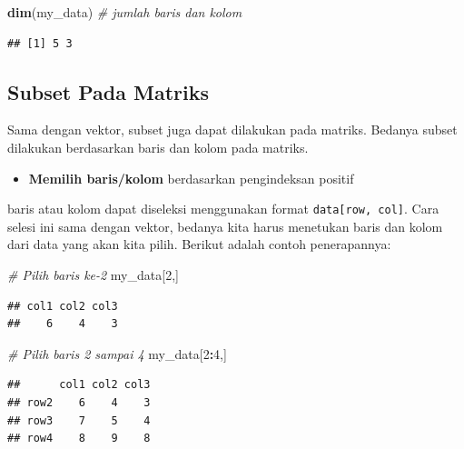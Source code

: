 \documentclass[]{book}
\newenvironment{Shaded}{\begin{snugshade}}{\end{snugshade}}
\newcommand{\KeywordTok}[1]{\textcolor[rgb]{0.13,0.29,0.53}{\textbf{#1}}}
\newcommand{\DecValTok}[1]{\textcolor[rgb]{0.00,0.00,0.81}{#1}}
\newcommand{\CommentTok}[1]{\textcolor[rgb]{0.56,0.35,0.01}{\textit{#1}}}
\newcommand{\OperatorTok}[1]{\textcolor[rgb]{0.81,0.36,0.00}{\textbf{#1}}}
\newcommand{\NormalTok}[1]{#1}
\providecommand{\tightlist}{%
  \setlength{\itemsep}{0pt}\setlength{\parskip}{0pt}}
\begin{document}
\begin{Shaded}
\begin{Highlighting}[]
\KeywordTok{dim}\NormalTok{(my_data) }\CommentTok{# jumlah baris dan kolom}
\end{Highlighting}
\end{Shaded}

\begin{verbatim}
## [1] 5 3
\end{verbatim}

\subsection{Subset Pada Matriks}\label{subset-pada-matriks}

Sama dengan vektor, subset juga dapat dilakukan pada matriks. Bedanya
subset dilakukan berdasarkan baris dan kolom pada matriks.

\begin{itemize}
\tightlist
\item
  \textbf{Memilih baris/kolom} berdasarkan pengindeksan positif
\end{itemize}

baris atau kolom dapat diseleksi menggunakan format
\texttt{data{[}row,\ col{]}}. Cara selesi ini sama dengan vektor,
bedanya kita harus menetukan baris dan kolom dari data yang akan kita
pilih. Berikut adalah contoh penerapannya:

\begin{Shaded}
\begin{Highlighting}[]
\CommentTok{# Pilih baris ke-2}
\NormalTok{my_data[}\DecValTok{2}\NormalTok{,]}
\end{Highlighting}
\end{Shaded}

\begin{verbatim}
## col1 col2 col3 
##    6    4    3
\end{verbatim}

\begin{Shaded}
\begin{Highlighting}[]
\CommentTok{# Pilih baris 2 sampai 4}
\NormalTok{my_data[}\DecValTok{2}\OperatorTok{:}\DecValTok{4}\NormalTok{,]}
\end{Highlighting}
\end{Shaded}

\begin{verbatim}
##      col1 col2 col3
## row2    6    4    3
## row3    7    5    4
## row4    8    9    8
\end{verbatim}
\end{document}
